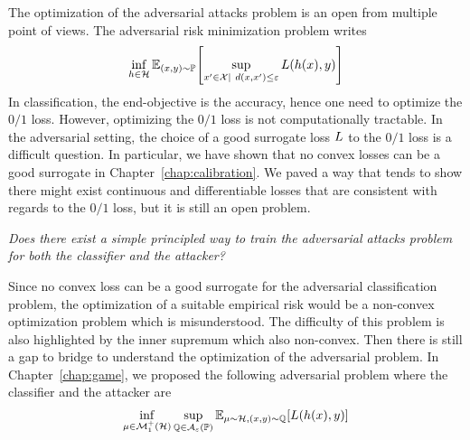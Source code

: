 The optimization of the adversarial attacks problem is an open from multiple point of views.
The adversarial risk minimization problem writes
\begin{align*}
    \inf_{h\in\mathcal{H}} \mathbb{E}_{(x,y)\sim\PP}\left[\sup_{x'\in\XX\mid~d(x,x')\leq\varepsilon}\loss(h(x),y)\right]
\end{align*}
In classification, the end-objective is the accuracy, hence one need to optimize the $0/1$ loss. However, optimizing the $0/1$ loss is not computationally tractable. In the adversarial setting, the choice of a good surrogate loss $L$ to the $0/1$ loss  is a difficult question. In particular, we have shown that no convex losses can be a good surrogate in Chapter~\ref{chap:calibration}.   We paved a way that tends to show there might exist continuous and differentiable losses that are consistent with regards to the $0/1$ loss, but it is still an open problem.
\begin{tcolorbox}[colback=grund,colframe=rahmen]
    \begin{center}
        \emph{Does there exist a simple principled way to train the adversarial attacks problem for both the classifier and the attacker?}
    \end{center}
\end{tcolorbox}
Since no convex loss can be a good surrogate for the adversarial classification problem, the optimization of a suitable empirical risk  would be a  non-convex optimization problem which is misunderstood. The difficulty of this problem is also highlighted by the inner supremum which also non-convex. Then there is still a gap to bridge to understand the optimization of the adversarial problem. 
In Chapter~\ref{chap:game}, we proposed the following adversarial problem where the classifier and the attacker are 
\begin{align*}
    \inf_{\mu \in\mathcal{M}_1^+(\mathcal{H})}\sup_{\QQ\in\mathcal{A}_\varepsilon(\PP)} \mathbb{E}_{\mu\sim\mathcal{H},(x,y)\sim\QQ}\left[\loss(h(x),y)\right]
\end{align*}
